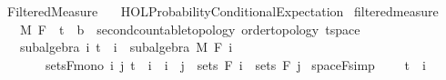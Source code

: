 %
\begin{isabellebody}%
%
%
\isadelimtheory
\isanewline
\isanewline
%
\endisadelimtheory
%
\isatagtheory
{}\isamarkupfalse%
\ Filtered{\isacharunderscore}{\kern0pt}Measure\isanewline
\ \ \ {\isachardoublequoteopen}HOL{\isacharminus}{\kern0pt}Probability{\isachardot}{\kern0pt}Conditional{\isacharunderscore}{\kern0pt}Expectation{\isachardoublequoteclose}\isanewline
{}%
\endisatagtheory
{\isafoldtheory}%
%
\isadelimtheory
%
\endisadelimtheory
%
\isadelimdocument
%
\endisadelimdocument
%
\isatagdocument
%
\isamarkuptrue%
%
\isamarkuptrue%
%
\endisatagdocument
{\isafolddocument}%
%
\isadelimdocument
%
\endisadelimdocument
{}\isamarkupfalse%
\ filtered{\isacharunderscore}{\kern0pt}measure\ {\isacharequal}{\kern0pt}\ \isanewline
\ \ \ M\ F\ \ t\ {\isacharcolon}{\kern0pt}{\isacharcolon}{\kern0pt}\ {\isachardoublequoteopen}{\isacharprime}{\kern0pt}b\ {\isacharcolon}{\kern0pt}{\isacharcolon}{\kern0pt}\ {\isacharbraceleft}{\kern0pt}second{\isacharunderscore}{\kern0pt}countable{\isacharunderscore}{\kern0pt}topology{\isacharcomma}{\kern0pt}\ order{\isacharunderscore}{\kern0pt}topology{\isacharcomma}{\kern0pt}\ t{}{\isacharunderscore}{\kern0pt}space{\isacharbraceright}{\kern0pt}{\isachardoublequoteclose}\isanewline
\ \ \ subalgebra{\isacharcolon}{\kern0pt}\ {\isachardoublequoteopen}{\isasymAnd}i{\isachardot}{\kern0pt}\ t\ {\isasymle}\ i\ {\isasymLongrightarrow}\ subalgebra\ M\ {\isacharparenleft}{\kern0pt}F\ i{\isacharparenright}{\kern0pt}{\isachardoublequoteclose}\isanewline
\ \ \ \ \ \ \ sets{\isacharunderscore}{\kern0pt}F{\isacharunderscore}{\kern0pt}mono{\isacharcolon}{\kern0pt}\ {\isachardoublequoteopen}{\isasymAnd}i\ j{\isachardot}{\kern0pt}\ t\ {\isasymle}\ i\ {\isasymLongrightarrow}\ i\ {\isasymle}\ j\ {\isasymLongrightarrow}\ sets\ {\isacharparenleft}{\kern0pt}F\ i{\isacharparenright}{\kern0pt}\ {\isasymle}\ sets\ {\isacharparenleft}{\kern0pt}F\ j{\isacharparenright}{\kern0pt}{\isachardoublequoteclose}\isanewline
{}\isanewline
\isanewline
{}\isamarkupfalse%
\ space{\isacharunderscore}{\kern0pt}F{\isacharbrackleft}{\kern0pt}simp{\isacharbrackright}{\kern0pt}{\isacharcolon}{\kern0pt}\ \isanewline
\ \ \ {\isachardoublequoteopen}t\ {\isasymle}\ i{\isachardoublequoteclose}\isanewline

\end{isabellebody}
